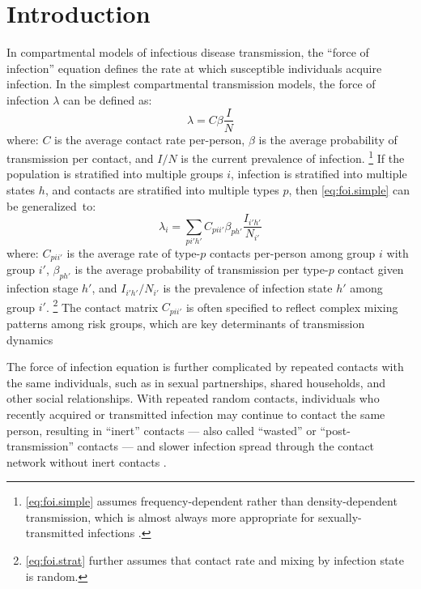 \section{Introduction}\label{intro} %
In compartmental models of infectious disease transmission,
the ``force of infection'' equation defines
the rate at which susceptible individuals acquire infection.
In the simplest compartmental transmission models,
the force of infection $\lambda$ can be defined as:
\begin{equation}\label{eq:foi.simple}
  \lambda = C \beta \frac{I}{N}
\end{equation} where:
$C$ is the average contact rate per-person,
$\beta$ is the average probability of transmission per contact, and
$I/N$ is the current prevalence of infection.%
\footnote{\eqref{eq:foi.simple} assumes
  frequency-dependent rather than density-dependent transmission, %
  which is almost always more appropriate for sexually-transmitted infections \cite{Begon2002}.}
If the population is stratified into multiple groups $i$,
infection is stratified into multiple states $h$, and
contacts are stratified into multiple types $p$,
then \eqref{eq:foi.simple} can be generalized~to:
\begin{equation}\label{eq:foi.strat}
  \lambda_i = \sum_{pi'h'} C_{pii'} \beta_{ph'} \frac{I_{i'h'}}{N_{i'}}
\end{equation}
where:
$C_{pii'}$ is the average rate of type-$p$ contacts per-person among group $i$ with group $i'$,
$\beta_{ph'}$ is the average probability of transmission per type-$p$ contact given infection stage $h'$, and
$I_{i'h'}/N_{i'}$ is the prevalence of infection state $h'$ among group $i'$.%
\footnote{\eqref{eq:foi.strat} further assumes that
  contact rate and mixing by infection state is random.}
The contact matrix $C_{pii'}$ is often specified to reflect
complex mixing patterns among risk groups,
which are key determinants of transmission dynamics \cite{Bansal2010,Rao2021}
\par
The force of infection equation is further complicated by
repeated contacts with the same individuals, such as
in sexual partnerships, shared households, and other social relationships.
With repeated \vs random contacts, individuals who recently acquired or transmitted infection
may continue to contact the same person, resulting in ``inert'' contacts
--- also called ``wasted'' or ``post-transmission'' contacts ---
and slower infection spread through the contact network \vs without inert contacts \cite{Smieszek2009}.
